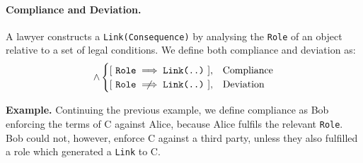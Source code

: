 \documentclass{article}
\numberwithin{equation}{section}
\newcommand{\quickexample}[1]{
\begin{tcolorbox}
	\textbf{Example.} #1
\end{tcolorbox}
}
\begin{document}
\paragraph{Compliance and Deviation.} A lawyer constructs a \texttt{Link(Consequence)} by analysing the \texttt{Role} of an object relative to a set of legal conditions. We define both compliance and deviation as:
\begin{equation}
[ \ \exists \ \texttt{Link(Existence, Consequence)} \ ] \land 
	\begin{cases}
		[ \ \texttt{Role} \implies \texttt{Link(..)} \ ], & \text{Compliance} \\
		[ \ \texttt{Role} \centernot\implies \texttt{Link(..)} \ ], & \text{Deviation}
	\end{cases}
\end{equation}

\vspace{0.25cm}
\quickexample{
	Continuing the previous example, we define compliance as Bob enforcing the terms of C against Alice, because Alice fulfils the relevant \texttt{Role}. Bob could not, however, enforce C against a third party, unless they also fulfilled a role which generated a \texttt{Link} to C.
}


\end{document}
